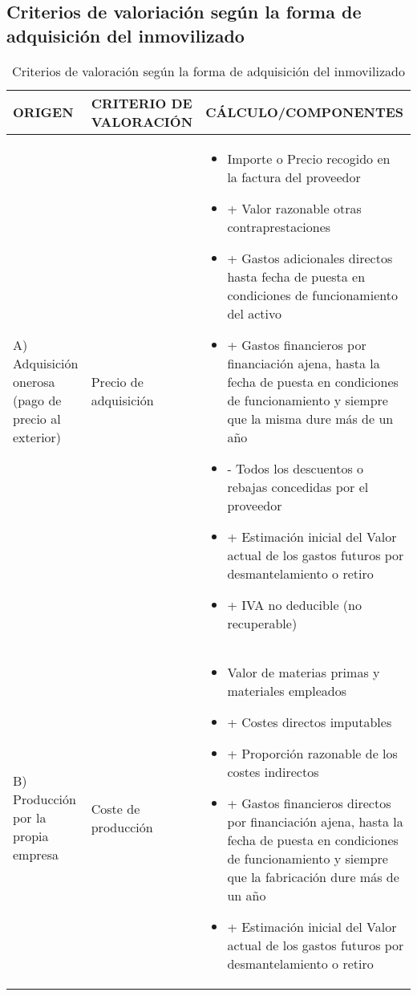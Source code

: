 \documentclass[a4paper,12pt]{article}
\begin{document}
\subsection{Criterios de valoriación según la forma de adquisición del inmovilizado}
\begin{table}[H]
\centering
\caption{Criterios de valoración según la forma de adquisición del inmovilizado}
\begin{tabular}{|p{4cm}|p{4cm}|p{8cm}|}
\hline
\textbf{ORIGEN} & \textbf{CRITERIO DE VALORACIÓN} & \textbf{CÁLCULO/COMPONENTES} \\
\hline
A) Adquisición onerosa (pago de precio al exterior) & Precio de adquisición & 
\begin{itemize}
    \item Importe o Precio recogido en la factura del proveedor
    \item + Valor razonable otras contraprestaciones
    \item + Gastos adicionales directos hasta fecha de puesta en condiciones de funcionamiento del activo
    \item + Gastos financieros por financiación ajena, hasta la fecha de puesta en condiciones de funcionamiento y siempre que la misma dure más de un año
    \item - Todos los descuentos o rebajas concedidas por el proveedor
    \item + Estimación inicial del Valor actual de los gastos futuros por desmantelamiento o retiro
    \item + IVA no deducible (no recuperable)
\end{itemize} \\
\hline
B) Producción por la propia empresa & Coste de producción & 
\begin{itemize}
    \item Valor de materias primas y materiales empleados
    \item + Costes directos imputables
    \item + Proporción razonable de los costes indirectos
    \item + Gastos financieros directos por financiación ajena, hasta la fecha de puesta en condiciones de funcionamiento y siempre que la fabricación dure más de un año
    \item + Estimación inicial del Valor actual de los gastos futuros por desmantelamiento o retiro
\end{itemize} \\
\hline
\end{tabular}
\end{table}
\end{document}
